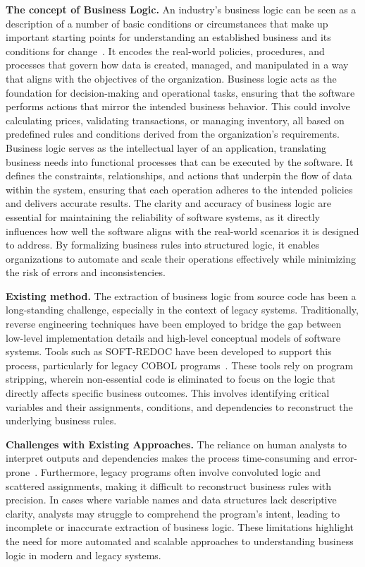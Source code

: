 \hspace{0.5cm} \textbf{The concept of Business Logic.} An industry's business logic can be seen as a description of a number of basic conditions or circumstances that make up important starting points for understanding an established business and its conditions for change~\cite{BusinessRules}. It encodes the real-world policies, procedures, and processes that govern how data is created, managed, and manipulated in a way that aligns with the objectives of the organization. Business logic acts as the foundation for decision-making and operational tasks, ensuring that the software performs actions that mirror the intended business behavior. This could involve calculating prices, validating transactions, or managing inventory, all based on predefined rules and conditions derived from the organization's requirements.
\hspace{0.5cm}Business logic serves as the intellectual layer of an application, translating business needs into functional processes that can be executed by the software. It defines the constraints, relationships, and actions that underpin the flow of data within the system, ensuring that each operation adheres to the intended policies and delivers accurate results. The clarity and accuracy of business logic are essential for maintaining the reliability of software systems, as it directly influences how well the software aligns with the real-world scenarios it is designed to address. By formalizing business rules into structured logic, it enables organizations to automate and scale their operations effectively while minimizing the risk of errors and inconsistencies.

\hspace{0.5cm} \textbf{Existing method.} The extraction of business logic from source code has been a long-standing challenge, especially in the context of legacy systems. Traditionally, reverse engineering techniques have been employed to bridge the gap between low-level implementation details and high-level conceptual models of software systems. Tools such as SOFT-REDOC have been developed to support this process, particularly for legacy COBOL programs~\cite{BusinessRules}. These tools rely on program stripping, wherein non-essential code is eliminated to focus on the logic that directly affects specific business outcomes. This involves identifying critical variables and their assignments, conditions, and dependencies to reconstruct the underlying business rules.

\hspace{0.5cm} \textbf{Challenges with Existing Approaches.} The reliance on human analysts to interpret outputs and dependencies makes the process time-consuming and error-prone~\cite{BusinessRules}. Furthermore, legacy programs often involve convoluted logic and scattered assignments, making it difficult to reconstruct business rules with precision. In cases where variable names and data structures lack descriptive clarity, analysts may struggle to comprehend the program's intent, leading to incomplete or inaccurate extraction of business logic. These limitations highlight the need for more automated and scalable approaches to understanding business logic in modern and legacy systems.

